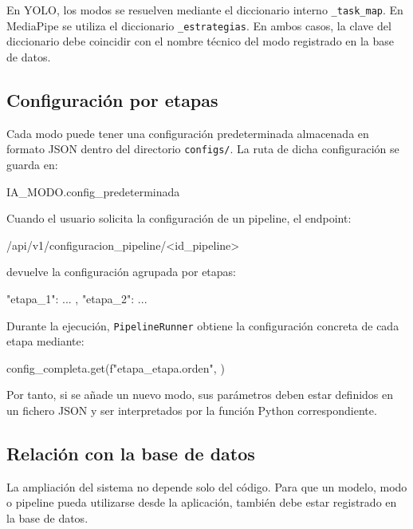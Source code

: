 En YOLO, los modos se resuelven mediante el diccionario interno \texttt{\_task\_map}. En MediaPipe se utiliza el diccionario \texttt{\_estrategias}. En ambos casos, la clave del diccionario debe coincidir con el nombre técnico del modo registrado en la base de datos.

\subsection{Configuración por etapas}

Cada modo puede tener una configuración predeterminada almacenada en formato JSON dentro del directorio \texttt{configs/}. La ruta de dicha configuración se guarda en:

\begin{bloqueCodigo}[title={Campo de configuración predeterminada}]
	IA_MODO.config_predeterminada
\end{bloqueCodigo}

Cuando el usuario solicita la configuración de un pipeline, el endpoint:

\begin{bloqueCodigo}[title={Endpoint de configuración de pipeline}]
	/api/v1/configuracion_pipeline/<id_pipeline>
\end{bloqueCodigo}

devuelve la configuración agrupada por etapas:

\begin{bloqueCodigo}[title={Formato de configuración por etapas}]
	{
		"etapa_1": { ... },
		"etapa_2": { ... }
	}
\end{bloqueCodigo}

Durante la ejecución, \texttt{PipelineRunner} obtiene la configuración concreta de cada etapa mediante:

\begin{bloqueCodigo}[title={Obtención de configuración por etapa}]
	config_completa.get(f"etapa_{etapa.orden}", {})
\end{bloqueCodigo}

Por tanto, si se añade un nuevo modo, sus parámetros deben estar definidos en un fichero JSON y ser interpretados por la función Python correspondiente.

\subsection{Relación con la base de datos}

La ampliación del sistema no depende solo del código. Para que un modelo, modo o pipeline pueda utilizarse desde la aplicación, también debe estar registrado en la base de datos.

